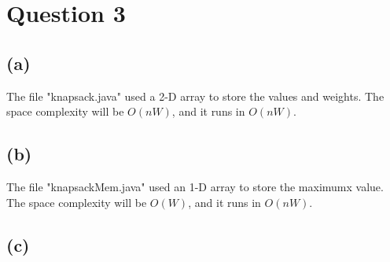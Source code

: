 \documentclass{article}
\begin{document}
\section*{Question 3}
\subsection*{(a)}

The file "knapsack.java" used a 2-D array to store the values and weights.
The space complexity will be $O(nW)$, and it runs in $O(nW)$.
\subsection*{(b)}

The file "knapsackMem.java" used an 1-D array to store the maximumx value.
The space complexity will be $O(W)$, and it runs in $O(nW)$.
\subsection*{(c)}
\end{document}
